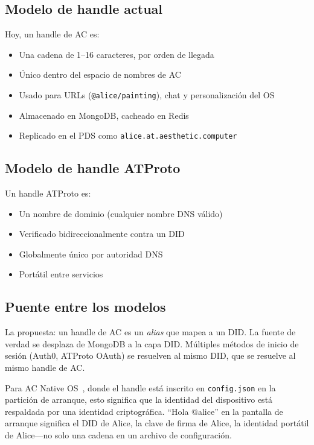 \documentclass[10pt,letterpaper,twocolumn]{article}
\begin{document}
\subsection{Modelo de handle actual}

Hoy, un handle de AC es:
\begin{itemize}
  \item Una cadena de 1--16 caracteres, por orden de llegada
  \item Único dentro del espacio de nombres de AC
  \item Usado para URLs (\texttt{@alice/painting}), chat y personalización del OS
  \item Almacenado en MongoDB, cacheado en Redis
  \item Replicado en el PDS como \texttt{alice.at.aesthetic.computer}
\end{itemize}

\subsection{Modelo de handle ATProto}

Un handle ATProto es:
\begin{itemize}
  \item Un nombre de dominio (cualquier nombre DNS válido)
  \item Verificado bidireccionalmente contra un DID
  \item Globalmente único por autoridad DNS
  \item Portátil entre servicios
\end{itemize}

\subsection{Puente entre los modelos}

La propuesta: un handle de AC es un \emph{alias} que mapea a un DID. La fuente de verdad se desplaza de MongoDB a la capa DID. Múltiples métodos de inicio de sesión (Auth0, ATProto OAuth) se resuelven al mismo DID, que se resuelve al mismo handle de AC.

Para AC Native OS~\citep{scudder2026os}, donde el handle está inscrito en \texttt{config.json} en la partición de arranque, esto significa que la identidad del dispositivo está respaldada por una identidad criptográfica. ``Hola @alice'' en la pantalla de arranque significa el DID de Alice, la clave de firma de Alice, la identidad portátil de Alice---no solo una cadena en un archivo de configuración.
\end{document}
